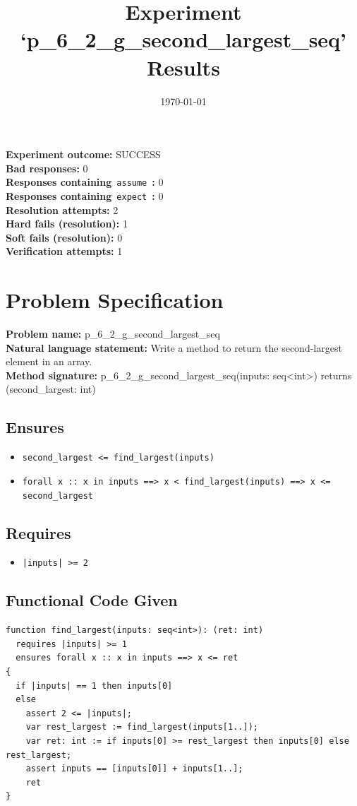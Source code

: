\documentclass{article}
\begin{document}
\title{Experiment `p\_6\_2\_g\_second\_largest\_seq' Results}
\author{\today}
\date{}
\maketitle
\textbf{Experiment outcome: }SUCCESS
\\\textbf{Bad responses: }0
\\\textbf{Responses containing}~\texttt{assume}~\textbf{: }0
\\\textbf{Responses containing}~\texttt{expect}~\textbf{: }0
\\\textbf{Resolution attempts: }2
\\\textbf{Hard fails (resolution): }1
\\\textbf{Soft fails (resolution): }0
\\\textbf{Verification attempts: }1
\section*{Problem Specification}
\textbf{Problem name: }p\_6\_2\_g\_second\_largest\_seq
\\\textbf{Natural language statement: }Write a method to return the second-largest element in an array.
\\\textbf{Method signature: }p\_6\_2\_g\_second\_largest\_seq(inputs: seq<int>) returns (second\_largest: int)
\subsection*{Ensures}
\begin{itemize}
\item \texttt{second\_largest <= find\_largest(inputs)}
\item \texttt{forall x :: x in inputs ==> x < find\_largest(inputs) ==> x <= second\_largest}
\end{itemize}
\subsection*{Requires}
\begin{itemize}
\item \texttt{|inputs| >= 2}
\end{itemize}
\subsection*{Functional Code Given}
\begin{lstlisting}
function find_largest(inputs: seq<int>): (ret: int)
  requires |inputs| >= 1
  ensures forall x :: x in inputs ==> x <= ret
{
  if |inputs| == 1 then inputs[0]
  else 
    assert 2 <= |inputs|;
    var rest_largest := find_largest(inputs[1..]);
    var ret: int := if inputs[0] >= rest_largest then inputs[0] else rest_largest;
    assert inputs == [inputs[0]] + inputs[1..]; 
    ret 
} 
\end{lstlisting}
\clearpage
\end{document}
